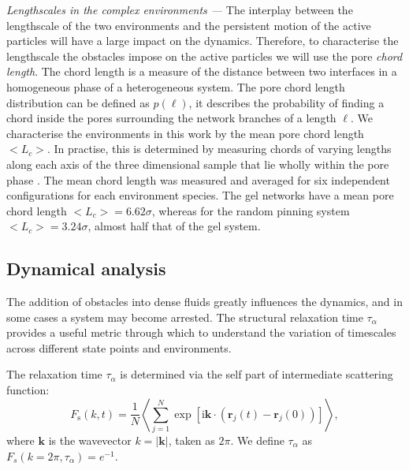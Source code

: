 \textit{Lengthscales in the complex environments ---} The interplay between the lengthscale of the two environments and the persistent motion of the active particles will have a large impact on the dynamics. Therefore, to characterise the lengthscale the obstacles impose on the active particles we will use the pore \textit{chord length}. The chord length is a measure of the distance between two interfaces in a homogeneous phase of a heterogeneous system. The pore chord length distribution can be defined as $p(\ell)$, it describes the probability of finding a chord inside the pores surrounding the network branches of a length $\ell$. We characterise the environments in this work by the mean pore chord length $<L_c>$. In practise, this is determined by measuring chords of varying lengths along each axis of the three dimensional sample that lie wholly within the pore phase \cite{whittle1999,testard2011}. The mean chord length was measured and averaged for six independent configurations for each environment species. The gel networks have a mean pore chord length $<L_c> = 6.62\sigma$, whereas for the random pinning system $<L_c> = 3.24\sigma$, almost half that of the gel system. 


\subsection{Dynamical analysis}
The addition of obstacles into dense fluids greatly influences the dynamics, and in some cases a system may become arrested. The structural relaxation time $\tau_{\alpha}$ provides a useful metric through which to understand the variation of timescales across different state points and environments.

The relaxation time $\tau_{\alpha}$ is determined via the self part of intermediate scattering function:
\begin{equation}
  	F_{\mathrm{s}}(k, t)=\frac{1}{N}\left\langle\sum_{j=1}^{N} \exp \left[\mathrm{i} \mathbf{k} \cdot\left(\mathbf{r}_{j}(t)-\mathbf{r}_{j}(0)\right)\right]\right\rangle,
\end{equation}
\noindent
where $\mathbf{k}$ is the wavevector $k=|\mathbf{k}|$, taken as $2\pi$. We define $\tau_{\alpha}$ as $F_s(k = 2\pi, \tau_{\alpha}) = e^{-1}$. 


